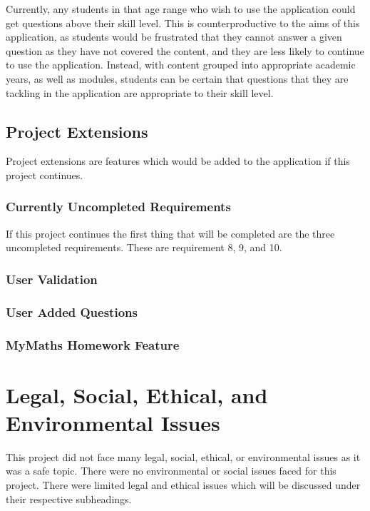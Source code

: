 \documentclass{article}
\begin{document}
Currently, any students in that age range who wish to use the application could get questions above their skill level. This is counterproductive to the aims of this application, as students would be frustrated that they cannot answer a given question as they have not covered the content, and they are less likely to continue to use the application. Instead, with content grouped into appropriate academic years, as well as modules, students can be certain that questions that they are tackling in the application are appropriate to their skill level. \\


\subsection{Project Extensions}

Project extensions are features which would be added to the application if this project continues. 

\subsubsection{Currently Uncompleted Requirements}

If this project continues the first thing that will be completed are the three uncompleted requirements. These are requirement 8, 9, and 10. 

\subsubsection{User Validation}

\subsubsection{User Added Questions}

\subsubsection{MyMaths Homework Feature}

\section{Legal, Social, Ethical, and Environmental Issues}
\label{section:issues}

This project did not face many legal, social, ethical, or environmental issues as it was a safe topic. There were no environmental or social issues faced for this project. There were limited legal and ethical issues which will be discussed under their respective subheadings. 
\end{document}
